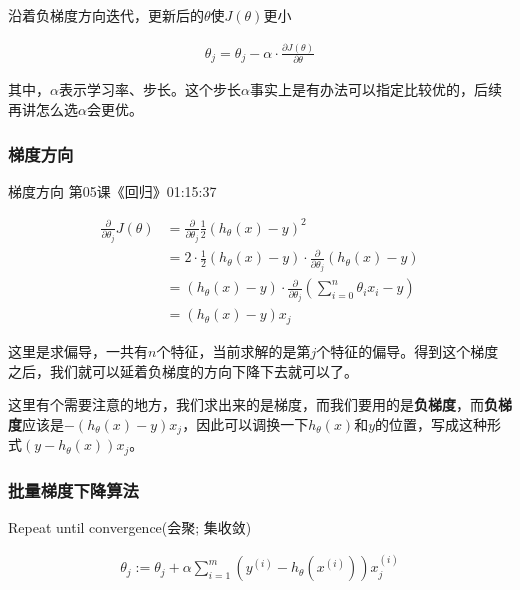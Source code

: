 \documentclass[UTF8]{ctexbook}
\begin{document}
沿着负梯度方向迭代，更新后的$\theta$使$J(\theta)$更小

\begin{equation}
\begin{aligned}
\theta_{j}=\theta_{j}-\alpha \cdot \frac{\partial J(\theta)}{\partial \theta}
\end{aligned}
\end{equation}

其中，$\alpha$表示学习率、步长。这个步长$\alpha$事实上是有办法可以指定比较优的，后续再讲怎么选$\alpha$会更优。

\subsubsection{梯度方向}
梯度方向 第05课《回归》01:15:37

\begin{equation}
\begin{aligned}
\frac{\partial}{\partial \theta_{j}} J(\theta)&=\frac{\partial}{\partial \theta_{j}} \frac{1}{2} (h_{\theta}(x)-y)^{2}\\
&=2 \cdot \frac{1}{2} (h_{\theta}(x)-y) \cdot \frac{\partial}{\partial \theta_{j}}(h_{\theta}(x)-y)\\
&=(h_{\theta}(x)-y) \cdot \frac{\partial}{\partial \theta_{j}}(\sum_{i=0}^{n}\theta_{i}x_{i}-y)\\
&=(h_{\theta}(x)-y)x_{j}
\end{aligned}
\end{equation}

这里是求偏导，一共有$n$个特征，当前求解的是第$j$个特征的偏导。得到这个梯度之后，我们就可以延着负梯度的方向下降下去就可以了。

这里有个需要注意的地方，我们求出来的是梯度，而我们要用的是\textbf{负梯度}，而\textbf{负梯度}应该是$-(h_{\theta}(x)-y)x_{j}$，因此可以调换一下$h_{\theta}(x)$和$y$的位置，写成这种形式$(y-h_{\theta}(x))x_{j}$。

\subsubsection{批量梯度下降算法}

Repeat until convergence(会聚; 集收敛)

\begin{equation}
\begin{aligned}
\theta_{j} := \theta_{j}+\alpha \sum_{i=1}^{m} (y^{(i)}-h_{\theta}(x^{(i)}))x^{(i)}_{j}
\end{aligned}
\end{equation}
\end{document}
